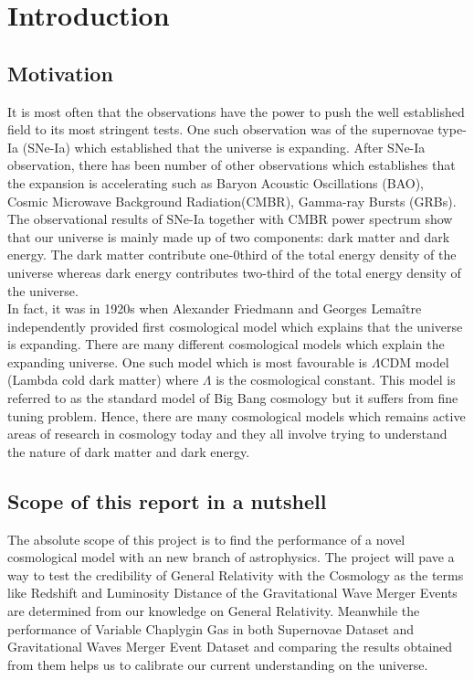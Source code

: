 



\chapter{Introduction}
\section{Motivation}
It is most often that the observations have the power to push the well established field to its most stringent tests. One such observation was of the supernovae type-Ia (SNe-Ia) which established that the universe is expanding. After SNe-Ia observation, there has been number of other observations which establishes that the expansion is accelerating such as Baryon Acoustic Oscillations (BAO), Cosmic Microwave Background Radiation(CMBR), Gamma-ray Bursts (GRBs). The observational results of SNe-Ia together with CMBR power spectrum show that our universe is mainly made up of two components: dark matter and dark energy. The dark matter contribute one-0third of the total energy density of the universe whereas dark energy contributes two-third of the total energy density of the universe.\\
In fact, it was in 1920s when Alexander Friedmann and Georges Lemaître independently provided first cosmological model which explains that the universe is expanding. There are many different cosmological models which explain the expanding universe. One such model which is most favourable is $\Lambda$CDM model (Lambda cold dark matter) where $\Lambda$ is the cosmological constant. This model is referred to as the standard model of Big Bang cosmology but it suffers from fine tuning problem. Hence, there are many cosmological models which remains active areas of research in cosmology today and they all involve trying to understand the nature of dark matter and dark energy. 
\section{Scope of this report in a nutshell}

The absolute scope of this project is to find the performance of a novel cosmological model with an new branch of astrophysics. The project will pave a way to test the credibility of General Relativity with the Cosmology as the terms like Redshift and Luminosity Distance of the Gravitational Wave Merger Events are determined from our knowledge on General Relativity. Meanwhile the performance of Variable Chaplygin Gas in both Supernovae Dataset and Gravitational Waves Merger Event Dataset and comparing the results obtained from them helps us to calibrate our current understanding on the universe.   